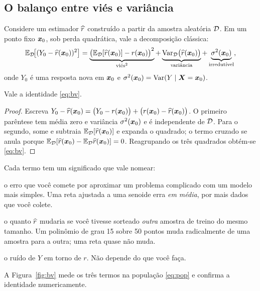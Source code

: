 \documentclass[11pt,a4paper]{article}
\begin{document}
\subsection{O balanço entre viés e variância}\label{sec:viesvariancia}
Considere um estimador $\widehat{r}$ construído a partir da amostra aleatória $\mathcal{D}$.
Em um ponto fixo $\bm{x}_0$, sob perda quadrática, vale a decomposição clássica:
\begin{equation}\label{eq:bv}
  \mathbb{E}_{\mathcal{D}}\!\big[(Y_0-\widehat{r}(\bm{x}_0))^2\big]
  = \underbrace{\big(\mathbb{E}_{\mathcal{D}}[\widehat{r}(\bm{x}_0)]-r(\bm{x}_0)\big)^2}_{\text{viés}^2}
  + \underbrace{\operatorname{Var}_{\mathcal{D}}\!\big(\widehat{r}(\bm{x}_0)\big)}_{\text{variância}}
  + \underbrace{\sigma^2(\bm{x}_0)}_{\text{irredutível}},
\end{equation}
onde $Y_0$ é uma resposta nova em $\bm{x}_0$ e $\sigma^2(\bm{x}_0)=\operatorname{Var}(Y\mid\bm{X}=\bm{x}_0)$.

\begin{teorema}\label{teo:bv}
Vale a identidade \eqref{eq:bv}.
\end{teorema}
\begin{proof}
Escreva $Y_0-\widehat{r}(\bm{x}_0) = \big(Y_0-r(\bm{x}_0)\big) + \big(r(\bm{x}_0)-\widehat{r}(\bm{x}_0)\big)$.
O primeiro parêntese tem média zero e variância $\sigma^2(\bm{x}_0)$ e é independente
de $\mathcal{D}$. Para o segundo, some e subtraia $\mathbb{E}_{\mathcal{D}}[\widehat{r}(\bm{x}_0)]$ e
expanda o quadrado; o termo cruzado se anula porque
$\mathbb{E}_{\mathcal{D}}[\widehat{r}(\bm{x}_0)-\mathbb{E}_{\mathcal{D}}\widehat{r}(\bm{x}_0)]=0$. Reagrupando os três quadrados
obtém-se \eqref{eq:bv}.
\end{proof}

\noindent
Cada termo tem um significado que vale nomear:
\begin{description}[leftmargin=2.4cm,style=nextline]
  \item[Viés] o erro que você comete por aproximar um problema complicado com um
        modelo mais simples. Uma reta ajustada a uma senoide erra \emph{em média},
        por mais dados que você colete.
  \item[Variância] o quanto $\widehat{r}$ mudaria se você tivesse sorteado \emph{outra}
        amostra de treino do mesmo tamanho. Um polinômio de grau 15 sobre 50 pontos
        muda radicalmente de uma amostra para a outra; uma reta quase não muda.
  \item[Irredutível] o ruído de $Y$ em torno de $r$. Não depende do que você faça.
\end{description}

A Figura~\ref{fig:bv} mede os três termos na população \eqref{eq:pop} e confirma a
identidade numericamente.
\end{document}
